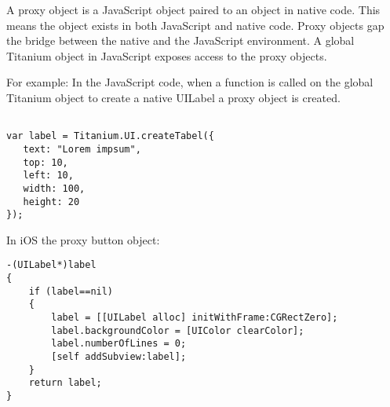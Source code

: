 A proxy object is a JavaScript object paired to an object in native code.\cite{Whinnery2012} This means the object exists in both JavaScript and native code. Proxy objects gap the bridge between the native and the JavaScript environment. A global Titanium object in JavaScript exposes access to the proxy objects. 

For example: In the JavaScript code, when a function is called on the global Titanium object to create a native UILabel a proxy object is created.

\begin{verbatim}

var label = Titanium.UI.createTabel({
   text: "Lorem impsum",
   top: 10,
   left: 10,
   width: 100,
   height: 20
});
\end{verbatim}


In iOS the proxy button object:

\begin{verbatim}
-(UILabel*)label
{
    if (label==nil)
    {
        label = [[UILabel alloc] initWithFrame:CGRectZero];
        label.backgroundColor = [UIColor clearColor];
        label.numberOfLines = 0;
        [self addSubview:label];
    }
    return label;
}
\end{verbatim}



